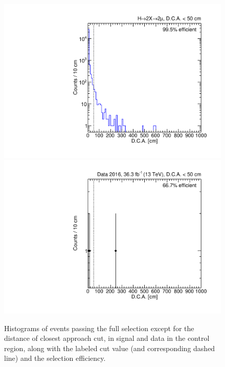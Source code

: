 \begin{figure}[p]
  \centering
  \includegraphics[width=\DSquareWidth]{figures/displaced/NM1_2Mu2J_DCA.pdf}
  \hspace*{-2em}
  \includegraphics[width=\DSquareWidth]{figures/displaced/NM1_Data_DCA.pdf}
  \caption[Histograms of events passing the full selection except for the distance of closest approach cut in \twoMu signal and data.]{Histograms of events passing the full selection except for the distance of closest approach cut, in  \twoMu signal and  data in the control region, along with the labeled cut value (and corresponding dashed line) and the selection efficiency.}
  \label{fig:dd:NM1_DCA}
\end{figure}

